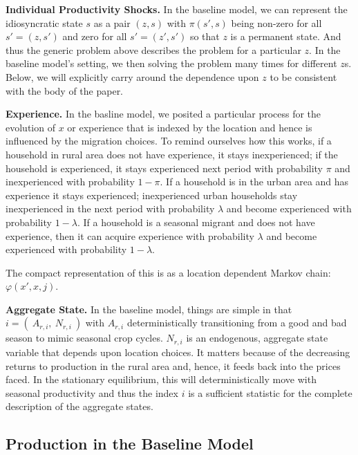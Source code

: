 \documentclass[12pt,pdftex]{article}
\begin{document}
\textbf{Individual Productivity Shocks.} In the baseline model, we can represent the idiosyncratic state $s$ as a pair $(z,s)$ with $\pi(s',s)$ being non-zero for all $s' = (z,s')$ and zero for all $s' = (z',s')$ so that $z$ is a permanent state. And thus the generic problem above describes the problem for a particular $z$. In the baseline model's setting, we then solving the problem many times for different $z$s. Below, we will explicitly carry around the dependence upon $z$ to be consistent with the body of the paper.

\textbf{Experience.} In the basline model, we posited a particular process for the evolution of $x$ or experience that is indexed by the location and hence is influenced by the migration choices. To remind ourselves how this works, if a household in rural area does not have experience, it stays inexperienced; if the household is experienced, it stays experienced next period with probability $\pi$ and inexperienced with probability $1-\pi$.  If a household is in the urban area and has experience it stays experienced; inexperienced urban households stay inexperienced in the next period with probability $\lambda$ and become experienced with probability $1-\lambda$. If a household is a seasonal migrant and does not have experience, then it can acquire experience with probability $\lambda$ and become experienced with probability $1-\lambda$.

The compact representation of this is as a location dependent Markov chain: $\varphi(x',x, j)$.

\textbf{Aggregate State.} In the baseline model, things are simple in that $i = ( \ A_{r,i}, \ N_{r,i} \ )$ with $A_{r,i}$ deterministically transitioning from a good and bad season to mimic seasonal crop cycles. $N_{r,i}$ is an endogenous, aggregate state variable that depends upon location choices. It matters because of the decreasing returns to production in the rural area and, hence, it feeds back into the prices faced. In the stationary equilibrium, this will deterministically move with seasonal productivity and thus the index $i$ is a sufficient statistic for the complete description of the aggregate states.

\subsection{Production in the Baseline Model}
\end{document}
